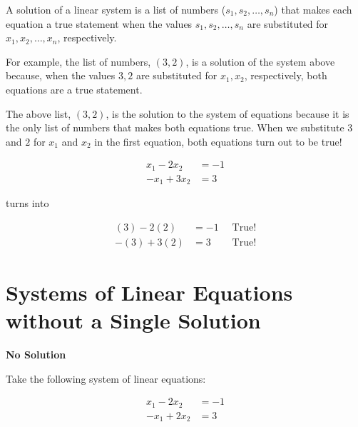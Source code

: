 \documentclass[
  letterpaper,
  DIV=11,
  numbers=noendperiod]{scrreprt}
\begin{document}
\begin{tcolorbox}[enhanced jigsaw, colbacktitle=quarto-callout-note-color!10!white, colback=white, colframe=quarto-callout-note-color-frame, title=\textcolor{quarto-callout-note-color}{\faInfo}\hspace{0.5em}{Definition of a solution}, opacityback=0, coltitle=black, left=2mm, leftrule=.75mm, rightrule=.15mm, opacitybacktitle=0.6, bottomrule=.15mm, titlerule=0mm, bottomtitle=1mm, breakable, toptitle=1mm, arc=.35mm, toprule=.15mm]

A solution of a linear system is a list of numbers
(\(s_1, s_2, \ldots, s_n\)) that makes each equation a true statement
when the values \(s_1, s_2, \ldots, s_n\) are substituted for
\(x_1, x_2, \ldots, x_n\), respectively.

For example, the list of numbers, \((3,2)\), is a solution of the system
above because, when the values \(3,2\) are substituted for \(x_1, x_2\),
respectively, both equations are a true statement.

\end{tcolorbox}

The above list, \((3,2)\), is the solution to the system of equations
because it is the only list of numbers that makes both equations true.
When we substitute \(3\) and \(2\) for \(x_1\) and \(x_2\) in the first
equation, both equations turn out to be true!

\[
\begin{align*}
x_1 - 2x_2 &= -1\\
-x_1 + 3x_2 &= 3
\end{align*}
\]

turns into

\[
\begin{align*}
(3) - 2(2) &= -1 \;\; &\text{True!}\\
-(3) + 3(2) &= 3 \;\; &\text{True!}
\end{align*}
\]

\hypertarget{systems-of-linear-equations-without-a-single-solution}{%
\section{Systems of Linear Equations without a Single
Solution}\label{systems-of-linear-equations-without-a-single-solution}}

\textbf{No Solution}

Take the following system of linear equations:

\[
\begin{align*}
x_1 - 2x_2 &= -1\\
-x_1 + 2x_2 &= 3
\end{align*}
\]
\end{document}
